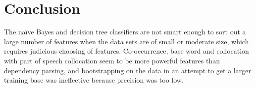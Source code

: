 \documentclass{article}
\newcommand{\naive}{na\"ive}
\begin{document}
\section{Conclusion}

The \naive{} Bayes and decision tree classifiers are not smart enough to sort out
a large number of features when the data sets are of small or moderate size,
which requires judicious choosing of features.  Co-occurrence, base word and
collocation with part of speech collocation seem to be more powerful features
than dependency parsing, and bootstrapping on the data in an attempt to get a
larger training base was ineffective because precision was too low.
\end{document}
